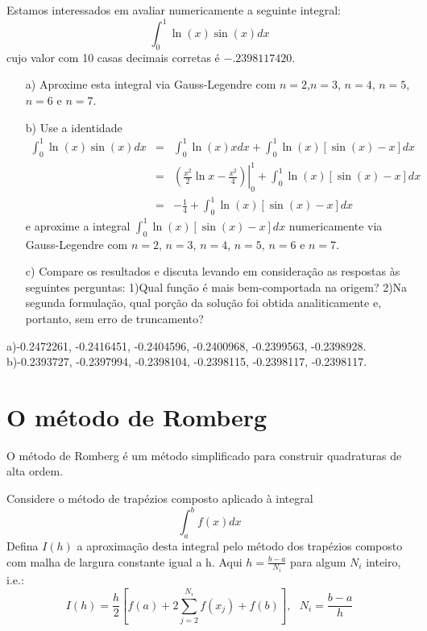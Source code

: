 \begin{exer}
Estamos interessados em avaliar numericamente a seguinte integral:
$$\int_0^1 \ln(x)\sin(x)dx$$
cujo valor com 10 casas decimais corretas é $-.2398117420$.
\begin{itemize}
\item[a)] Aproxime esta integral via Gauss-Legendre com $n=2$,$n=3$, $n=4$, $n=5$, $n=6$ e $n=7$.
\item[b)] Use a identidade
\begin{eqnarray*}
\int_0^1 \ln(x)\sin(x)dx&=&\int_0^1 \ln(x)xdx+\int_0^1 \ln(x)\left[\sin(x)-x\right]dx\\
&=&\left.\left(\frac{x^2}{2}\ln x-\frac{x^2}{4}\right)\right|_0^1+\int_0^1 \ln(x)\left[\sin(x)-x\right]dx\\
&=&-\frac{1}{4}+\int_0^1 \ln(x)\left[\sin(x)-x\right]dx
\end{eqnarray*}
e aproxime a integral $\int_0^1 \ln(x)\left[\sin(x)-x\right]dx$ numericamente via Gauss-Legendre com $n=2$, $n=3$, $n=4$, $n=5$, $n=6$ e $n=7$.
\item[c)] Compare os resultados e discuta levando em consideração as respostas às seguintes perguntas: 1)Qual função é mais bem-comportada na origem? 2)Na segunda formulação, qual porção da solução foi obtida analiticamente e, portanto, sem erro de truncamento?
\end{itemize}
\end{exer}
\begin{resp}
  
    a)-0.2472261,  -0.2416451,  -0.2404596,  -0.2400968,  -0.2399563,  -0.2398928.
    b)-0.2393727,  -0.2397994,  -0.2398104,  -0.2398115,  -0.2398117,  -0.2398117.  
  
\end{resp}

\section{O método de Romberg}
O método de Romberg é um método simplificado para construir quadraturas de alta ordem.

Considere o método de trapézios composto aplicado à integral
$$\int_a^bf(x)dx$$
Defina $I(h)$ a aproximação desta integral pelo método dos trapézios composto com  malha de largura constante igual a h. Aqui $h=\frac{b-a}{N_i}$ para algum $N_i$ inteiro, i.e.:
$$I(h)=\frac{h}{2}\left[f(a)+2\sum_{j=2}^{N_i} f(x_j)+ f(b)\right],~~~N_i=\frac{b-a}{h}$$

